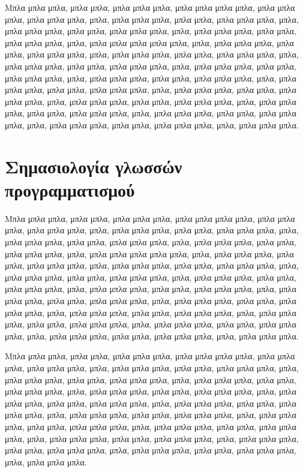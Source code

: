Μπλα μπλα μπλα, μπλα μπλα, μπλα μπλα μπλα, μπλα μπλα μπλα μπλα,
μπλα μπλα μπλα, μπλα μπλα μπλα, μπλα, μπλα μπλα μπλα, μπλα μπλα,
μπλα μπλα μπλα, μπλα, μπλα μπλα μπλα, μπλα μπλα, μπλα μπλα μπλα,
μπλα, μπλα μπλα μπλα, μπλα μπλα, μπλα μπλα μπλα, μπλα, μπλα μπλα
μπλα μπλα μπλα, μπλα, μπλα μπλα μπλα, μπλα μπλα, μπλα μπλα μπλα,
μπλα, μπλα μπλα μπλα, μπλα μπλα, μπλα μπλα μπλα, μπλα, μπλα μπλα
μπλα, μπλα μπλα, μπλα μπλα μπλα, μπλα, μπλα μπλα μπλα, μπλα μπλα,
μπλα μπλα μπλα, μπλα, μπλα μπλα μπλα, μπλα μπλα, μπλα μπλα μπλα,
μπλα, μπλα μπλα μπλα, μπλα μπλα, μπλα μπλα μπλα, μπλα, μπλα μπλα
μπλα, μπλα μπλα, μπλα μπλα μπλα, μπλα, μπλα μπλα μπλα, μπλα μπλα,
μπλα μπλα μπλα, μπλα, μπλα μπλα μπλα, μπλα μπλα, μπλα μπλα μπλα,
μπλα, μπλα μπλα μπλα, μπλα μπλα, μπλα μπλα μπλα, μπλα, μπλα μπλα
μπλα, μπλα μπλα, μπλα μπλα μπλα, μπλα, μπλα μπλα μπλα.


\section{Σημασιολογία γλωσσών προγραμματισμού}

Μπλα μπλα μπλα, μπλα μπλα, μπλα μπλα μπλα, μπλα μπλα μπλα μπλα,
μπλα μπλα μπλα, μπλα μπλα μπλα, μπλα, μπλα μπλα μπλα, μπλα μπλα,
μπλα μπλα μπλα, μπλα, μπλα μπλα μπλα, μπλα μπλα, μπλα μπλα μπλα,
μπλα, μπλα μπλα μπλα, μπλα μπλα, μπλα μπλα μπλα, μπλα, μπλα μπλα
μπλα μπλα μπλα, μπλα, μπλα μπλα μπλα, μπλα μπλα, μπλα μπλα μπλα,
μπλα, μπλα μπλα μπλα, μπλα μπλα, μπλα μπλα μπλα, μπλα, μπλα μπλα
μπλα, μπλα μπλα, μπλα μπλα μπλα, μπλα, μπλα μπλα μπλα, μπλα μπλα,
μπλα \nocite{*} μπλα μπλα, μπλα, μπλα μπλα μπλα, μπλα μπλα, μπλα
μπλα μπλα, μπλα, μπλα μπλα μπλα, μπλα μπλα, μπλα μπλα μπλα, μπλα,
μπλα μπλα μπλα, μπλα μπλα, μπλα μπλα μπλα, μπλα, μπλα μπλα μπλα,
μπλα μπλα, μπλα μπλα μπλα, μπλα, μπλα μπλα μπλα, μπλα μπλα, μπλα
μπλα μπλα, μπλα, μπλα μπλα μπλα, μπλα μπλα, μπλα μπλα μπλα, μπλα,
μπλα μπλα μπλα, μπλα μπλα, μπλα μπλα μπλα, μπλα, μπλα μπλα μπλα.

Μπλα μπλα μπλα, μπλα μπλα, μπλα μπλα μπλα, μπλα μπλα μπλα μπλα,
μπλα μπλα μπλα, μπλα μπλα μπλα, μπλα, μπλα μπλα μπλα, μπλα μπλα,
μπλα μπλα μπλα, μπλα, μπλα μπλα μπλα, μπλα μπλα, μπλα μπλα μπλα,
μπλα, μπλα μπλα μπλα, μπλα μπλα, μπλα μπλα μπλα, μπλα, μπλα μπλα
μπλα, μπλα μπλα, μπλα μπλα μπλα, μπλα, μπλα μπλα μπλα, μπλα μπλα,
μπλα μπλα μπλα, μπλα, μπλα μπλα μπλα, μπλα μπλα, μπλα μπλα μπλα,
μπλα, μπλα μπλα μπλα, μπλα μπλα, μπλα μπλα μπλα, μπλα, μπλα μπλα
μπλα, μπλα μπλα, μπλα μπλα μπλα, μπλα, μπλα μπλα μπλα, μπλα μπλα,
μπλα μπλα μπλα, μπλα, μπλα μπλα μπλα, μπλα μπλα, μπλα μπλα μπλα,
μπλα, μπλα μπλα μπλα, μπλα μπλα, μπλα μπλα μπλα, μπλα, μπλα μπλα
μπλα, μπλα μπλα, μπλα μπλα μπλα, μπλα, μπλα μπλα μπλα.


